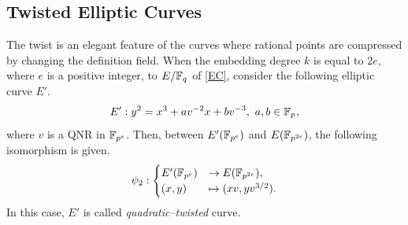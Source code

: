 \subsection{Twisted Elliptic Curves}\label{sec:twist}
The twist is an elegant feature of the curves where rational points are compressed by changing the definition field.
When the embedding degree $k$ is equal to $2e$, where $e$ is a positive integer, to $E/{\mathbb{F}}_{q^{}}$ of \eqref{EC}, consider the following elliptic curve $E'$.
\begin{equation}
E':y^2=x^3+av^{-2}x+bv^{-3},\ a,b\in {\mathbb{F}}_{p^{}}, \label{TEC}
\end{equation}
where $v$ is a QNR in ${\mathbb{F}}_{p^{e}}$. Then, between $E'({\mathbb{F}}_{p^{e}})$ and $E({\mathbb{F}}_{p^{2e}})$, the following isomorphism is given.
\begin{eqnarray}
\psi_2 : 
\begin{cases}
E'({\mathbb{F}}_{p^{e}}) & \rightarrow  E({\mathbb{F}}_{p^{2e}}), \\
(x,y) & \mapsto (xv,yv^{3/2}).
\end{cases} \label{2t}
\end{eqnarray}
In this case, $E'$ is called {\it quadratic--twisted} curve.

